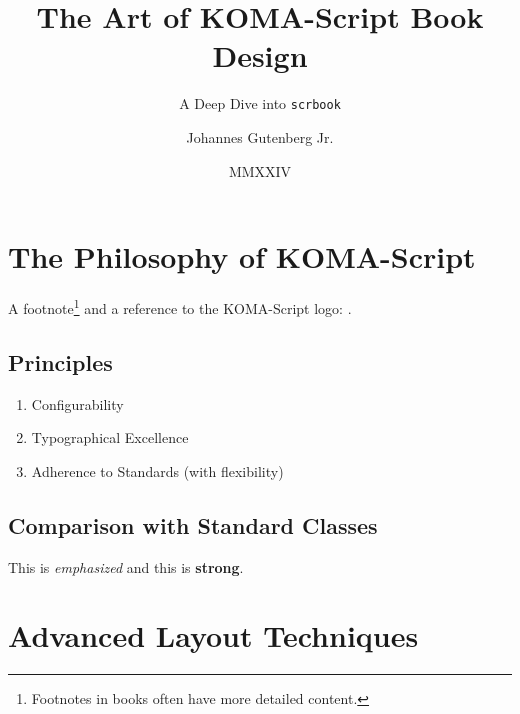 \documentclass[
    a4paper,
    11pt,
    DIV=12,
    BCOR=10mm,          %
    twoside,
    headings=normal,
    open=right,         %
    toc=bibliography,
    toc=listof,
    listof=totoc,
    parskip=false,      %
    captions=tableheading,
    numbers=autoendperiod,
    appendixprefix=true,
    chapterprefix=true
]{scrbook}
\title{The Art of KOMA-Script Book Design}
\subtitle{A Deep Dive into \texttt{scrbook}}
\author{Johannes Gutenberg Jr.}
\date{MMXXIV}
\begin{document}
\frontmatter %

\maketitle

\clearpage

\tableofcontents
\listoftables
\lstlistoflistings%
\clearpage

\mainmatter %

\chapter{The Philosophy of KOMA-Script}
\lipsum[2-4]
A footnote\footnote{Footnotes in books often have more detailed content.} and a  reference to the KOMA-Script logo: \KOMAScript.

\section{Principles}
\lipsum[5-6]
\begin{enumerate}
  \item Configurability
  \item Typographical Excellence
  \item Adherence to Standards (with flexibility)
\end{enumerate}

\section{Comparison with Standard Classes}
\lipsum[7-8]
This is \textit{emphasized} and this is \textbf{strong}.

\chapter{Advanced Layout Techniques}
\end{document}
